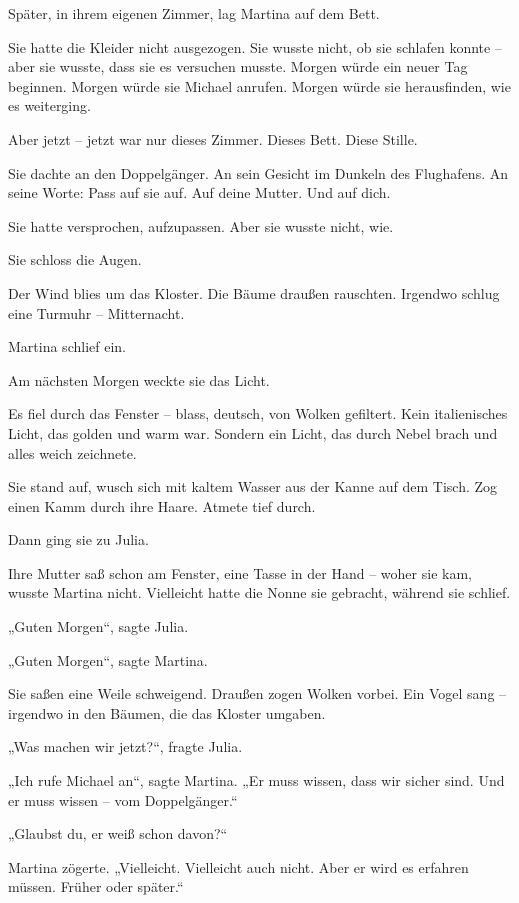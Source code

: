 \documentclass[
]{article}
\begin{document}
Später, in ihrem eigenen Zimmer, lag Martina auf dem Bett.

Sie hatte die Kleider nicht ausgezogen. Sie wusste nicht, ob sie schlafen konnte -- aber sie wusste, dass sie es versuchen musste. Morgen würde ein neuer Tag beginnen. Morgen würde sie Michael anrufen. Morgen würde sie herausfinden, wie es weiterging.

Aber jetzt -- jetzt war nur dieses Zimmer. Dieses Bett. Diese Stille.

Sie dachte an den Doppelgänger. An sein Gesicht im Dunkeln des Flughafens. An seine Worte: Pass auf sie auf. Auf deine Mutter. Und auf dich.

Sie hatte versprochen, aufzupassen. Aber sie wusste nicht, wie.

Sie schloss die Augen.

Der Wind blies um das Kloster. Die Bäume draußen rauschten. Irgendwo schlug eine Turmuhr -- Mitternacht.

Martina schlief ein.

Am nächsten Morgen weckte sie das Licht.

Es fiel durch das Fenster -- blass, deutsch, von Wolken gefiltert. Kein italienisches Licht, das golden und warm war. Sondern ein Licht, das durch Nebel brach und alles weich zeichnete.

Sie stand auf, wusch sich mit kaltem Wasser aus der Kanne auf dem Tisch. Zog einen Kamm durch ihre Haare. Atmete tief durch.

Dann ging sie zu Julia.

Ihre Mutter saß schon am Fenster, eine Tasse in der Hand -- woher sie kam, wusste Martina nicht. Vielleicht hatte die Nonne sie gebracht, während sie schlief.

„Guten Morgen``, sagte Julia.

„Guten Morgen``, sagte Martina.

Sie saßen eine Weile schweigend. Draußen zogen Wolken vorbei. Ein Vogel sang -- irgendwo in den Bäumen, die das Kloster umgaben.

„Was machen wir jetzt?{\kern0pt}``, fragte Julia.

„Ich rufe Michael an``, sagte Martina. „Er muss wissen, dass wir sicher sind. Und er muss wissen -- vom Doppelgänger.``

„Glaubst du, er weiß schon davon?{\kern0pt}``

Martina zögerte. „Vielleicht. Vielleicht auch nicht. Aber er wird es erfahren müssen. Früher oder später.``
\end{document}
